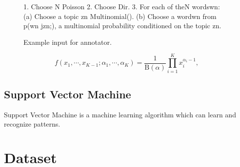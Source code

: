 \begin{figure}[h]
\fontsize{12}{4}\selectfont 
\begin{centerverbatim}
1. Choose N Poisson
2. Choose Dir.
3. For each of theN wordswn:
        (a) Choose a topic zn Multinomial().
        (b) Choose a wordwn from p(wn jzn;), 
            a multinomial probability conditioned on the topic
            zn.
\end{centerverbatim}
 \caption{Example input for annotator. }
\end{figure}


\begin{equation}
f \left(x_1,\cdots, x_{K-1}; \alpha_1,\cdots, \alpha_K \right) = \frac{1}{\mathrm{B}(\alpha)} \prod_{i=1}^K x_i^{\alpha_i - 1},
\end{equation}


\subsection{Support Vector Machine}

Support Vector Machine\citep{cortes} is a machine learning algorithm which can learn and recognize 	patterns. \citep{Aizerman67theoretical}

\section{Dataset}


